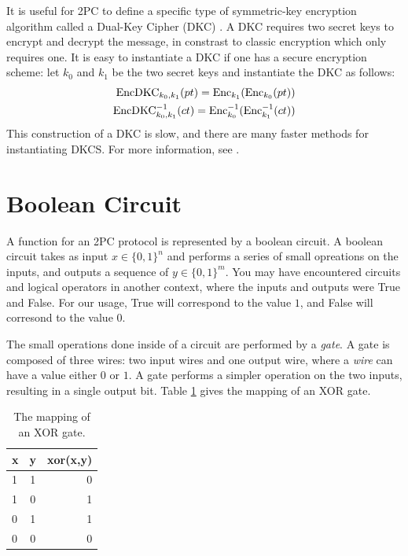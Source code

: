 It is useful for 2PC to define a specific type of symmetric-key encryption algorithm called a Dual-Key Cipher (DKC) \cite{bellare2012foundations}.
A DKC requires two secret keys to encrypt and decrypt the message, in constrast to classic encryption which only requires one.
It is easy to instantiate a DKC if one has a secure encryption scheme: let $k_0$ and $k_1$ be the two secret keys and instantiate the DKC as follows:
\begin{equation}
    \begin{split}
        \operatorname{EncDKC}_{k_0, k_1}(pt) = \operatorname{Enc}_{k_1} ( \operatorname{Enc}_{k_0} ( pt )) \\
        \operatorname{EncDKC}^{-1}_{k_0, k_1}(ct) = \operatorname{Enc}^{-1}_{k_0} ( \operatorname{Enc}^{-1}_{k_1} ( ct )) 
    \end{split}
\end{equation}
This construction of a DKC is slow, and there are many faster methods for instantiating DKCS.
For more information, see \cite{bellare2012foundations}.

\section{Boolean Circuit} 
A function for an 2PC protocol is represented by a boolean circuit.
A boolean circuit takes as input $x \in \{0,1\}^n$ and performs a series of small opreations on the inputs, and outputs a sequence of $y \in \{0,1\}^m$. 
You may have encountered circuits and logical operators in another context, where the inputs and outputs were True and False.
For our usage, True will correspond to the value $1$, and False will corresond to the value $0$. 

The small operations done inside of a circuit are performed by a \emph{gate}.
A gate is composed of three wires: two input wires and one output wire, where a \emph{wire} can have a value either $0$ or $1$.
A gate performs a simpler operation on the two inputs, resulting in a single output bit.
Table \ref{tab:xor} gives the mapping of an XOR gate.

\begin{table}[h]
\label{tab:xor}
\centering
\begin{tabular}{ | l | c || r |}
\hline
x & y & xor(x,y) \\ \hline
1 & 1 & 0 \\ \hline
1 & 0 & 1 \\ \hline
0 & 1 & 1 \\ \hline
0 & 0 & 0 \\ \hline
\end{tabular}
\caption{The mapping of an XOR gate.}
\end{table}

